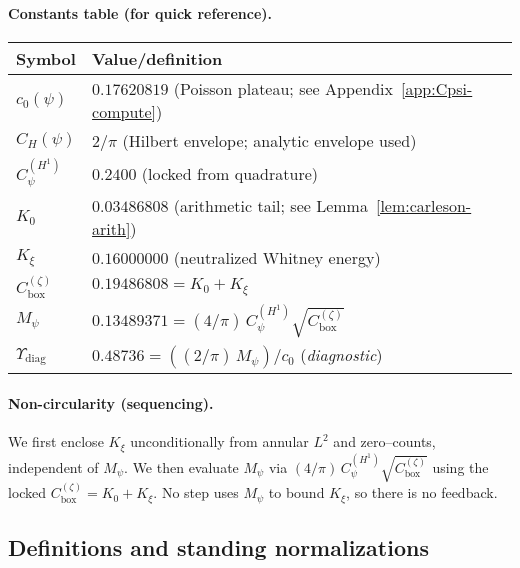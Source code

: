 \documentclass[11pt]{article}
\providecommand{\czeroplateau}{0.17620819}%
\providecommand{\Kxi}{K_\xi}
\providecommand{\CboxZeta}{K_0 + K_\xi}%
\providecommand{\CHone}{2/\pi}%
\providecommand{\CpsiHone}{0.2400}%
\providecommand{\Mpsilocked}{(4/\pi)\,\CpsiHone\,\sqrt{\CboxZeta}}
\providecommand{\UpsilonLocked}{(2/\pi)\,\Mpsilocked/\czeroplateau}%
\renewcommand{\Kxi}{0.16000000}
\renewcommand{\CboxZeta}{0.19486808}
\renewcommand{\Mpsilocked}{0.13489371}
\renewcommand{\UpsilonLocked}{0.48736}
\theoremstyle{definition}
\theoremstyle{remark}
\begin{document}
\paragraph{Constants table (for quick reference).}
\begin{center}
\begin{tabular}{ll}
\toprule
Symbol & Value/definition \\
\midrule
$c_0(\psi)$ & $\czeroplateau$ (Poisson plateau; see Appendix~\ref{app:Cpsi-compute}) \\
$C_H(\psi)$ & $\CHone$ (Hilbert envelope; analytic envelope used) \\
$C_\psi^{(H^1)}$ & $\CpsiHone$ (locked from quadrature) \\
$K_0$ & $0.03486808$ (arithmetic tail; see Lemma~\ref{lem:carleson-arith}) \\
$K_\xi$ & $\Kxi$ (neutralized Whitney energy) \\
$C_{\mathrm{box}}^{(\zeta)}$ & $\CboxZeta=K_0+K_\xi$ \\
$M_\psi$ & $\Mpsilocked=(4/\pi)\,C_\psi^{(H^1)}\sqrt{C_{\mathrm{box}}^{(\zeta)}}$ \\
\(\Upsilon_{\mathrm{diag}}\) & $\UpsilonLocked=((2/\pi)\,M_\psi)/c_0$ \quad(\emph{diagnostic})\\
\bottomrule
\end{tabular}
\end{center}





\vspace{1.0cm}
\paragraph{Non-circularity (sequencing).}
We first enclose \(K_\xi\) unconditionally from annular $L^2$ and zero–counts, independent of \(M_\psi\). We then evaluate \(M_\psi\) via \((4/\pi)\,C_\psi^{(H^1)}\sqrt{C_{\mathrm{box}}^{(\zeta)}}\) using the locked \(C_{\mathrm{box}}^{(\zeta)}=K_0+K_\xi\). No step uses \(M_\psi\) to bound \(K_\xi\), so there is no feedback.







\vspace{1.0cm}
\subsection*{Definitions and standing normalizations}
\end{document}
